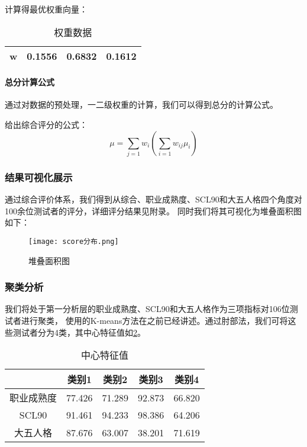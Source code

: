 \documentclass[withoutpreface,bwprint]{cumcmthesis} %
\begin{document}
计算得最优权重向量：

\begin{table}[h]
    \centering
    \begin{tabular}{cccc}
        \toprule
        w & 0.1556 & 0.6832 & 0.1612 \\ \bottomrule
    \end{tabular}
    \caption{权重数据}
    \label{tab:weights}
\end{table}

\paragraph*{总分计算公式} 通过对数据的预处理，一二级权重的计算，我们可以得到总分的计算公式。


给出综合评分的公式：
\begin{equation}
    \mu = \sum_{j=1} w_i (\sum_{i=1} w_{ij}\mu_i)
\end{equation}

\subsubsection{结果可视化展示}
通过综合评价体系，我们得到从综合、职业成熟度、SCL90和大五人格四个角度对100余位测试者的评分，详细评分结果见附录。
同时我们将其可视化为堆叠面积图如下：

\begin{figure}[!h]
    \centering
    \texttt{[image: score分布.png]}
    \caption{堆叠面积图}
    \label{fig:cluster}
\end{figure}

\subsubsection{聚类分析}

我们将处于第一分析层的职业成熟度、SCL90和大五人格作为三项指标对106位测试者进行聚类，
使用的K-means方法在之前已经讲述。通过肘部法，我们可将这些测试者分为4类，其中心特征值如\cref{tab:cluster}。

\begin{table}[htbp]
    \centering
    \begin{tabular}{|c|c|c|c|c|}
        \hline
        & 类别1 & 类别2 & 类别3 & 类别4 \\
        \hline
        职业成熟度 & 77.426 & 71.289 & 92.873 & 66.820 \\
        \hline
        SCL90 & 91.461 & 94.233 & 98.386 & 64.206 \\
        \hline
        大五人格 & 87.676 & 63.007 & 38.201 & 71.619 \\
        \hline
    \end{tabular}
    \caption{中心特征值}
    \label{tab:cluster}
\end{table}
\end{document}
